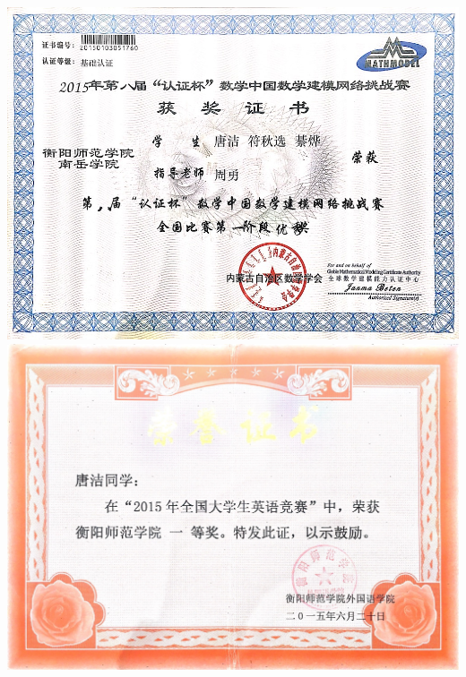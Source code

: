 \documentclass[UFT8]{ctexart}%
\begin{document}
\begin{center}
 \includegraphics[scale=0.36]{figs/2015-09.jpg }
 \includegraphics[scale=0.2]{figs/2015-06.jpg }
\end{center}


\end{document}

